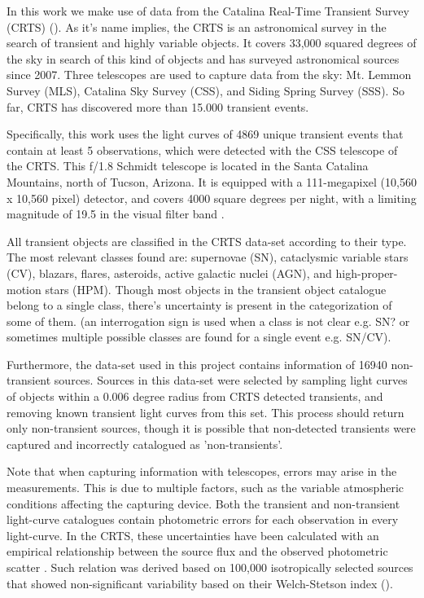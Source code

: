 
In this work we make use of data from the Catalina Real-Time Transient Survey (CRTS) (\cite{1111.2566}). As it's name implies, the CRTS is an astronomical survey in the search of transient and highly variable objects. It covers 33,000 squared degrees of the sky in search of this kind of objects and has surveyed astronomical sources since 2007. Three telescopes are used to capture data from the sky: Mt. Lemmon Survey (MLS), Catalina Sky Survey (CSS), and Siding Spring Survey (SSS). So far, CRTS has discovered more than 15.000 transient events.

Specifically, this work uses the light curves of 4869 unique transient events that contain at least 5 observations, which were detected with the CSS telescope of the CRTS. This f/1.8 Schmidt telescope is located in the Santa Catalina Mountains, north of Tucson, Arizona. It is equipped with a 111-megapixel (10,560 x 10,560 pixel) detector, and covers 4000 square degrees per night, with a limiting magnitude of 19.5 in the visual filter band
.%

All transient objects are classified in the CRTS data-set according to their type. The most relevant classes found are: supernovae (SN), cataclysmic variable stars (CV), blazars, flares, asteroids, active galactic nuclei (AGN), and high-proper-motion stars (HPM). Though most objects in the transient object catalogue belong to a single class, there's uncertainty is present in the categorization of some of them. (an interrogation sign is used when a class is not clear e.g. SN? or sometimes multiple possible classes are found for a single event e.g. SN/CV).

Furthermore, the data-set used in this project contains information of 16940 non-transient sources. Sources in this data-set were selected by sampling light curves of objects within a 0.006 degree radius from CRTS detected transients, and removing known transient light curves from this set. This process should return only non-transient sources, though it is possible that non-detected transients were captured and incorrectly catalogued as 'non-transients'.

Note that when capturing information with telescopes, errors may arise in the measurements. This is due to multiple factors, such as the variable atmospheric conditions affecting the capturing device. Both the transient and non-transient light-curve catalogues contain photometric errors for each observation in every light-curve. In the CRTS, these uncertainties have been calculated with an empirical relationship between the source flux and the observed photometric scatter .%
Such relation was derived based on 100,000 isotropically selected sources that showed non-significant variability based on their Welch-Stetson index (\cite{1996PASP..108..851S}).


